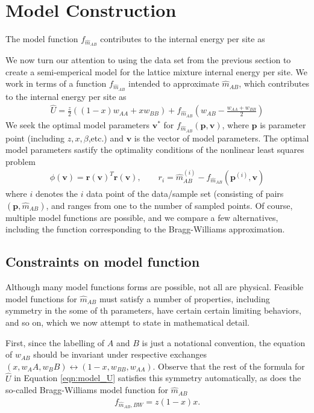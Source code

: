 \documentclass[10pt]{article}
\begin{document}
\section{Model Construction}
The model function $f_{\hat{m}_{AB}}$ contributes to the internal energy per site as

We now turn our attention to using the data set from the previous section to create a semi-emperical model for the lattice mixture internal energy per site.
We work in terms of a function $f_{\hat{m}_{AB}}$ intended to approximate $\hat{m}_{AB}$, which contributes to the internal energy per site as
\begin{align}
    \hat{U} = \frac{z}{2} \left( (1-x) w_{AA} + x w_{BB} \right) +
    f_{\hat{m}_{AB}} \left( w_{AB} - \frac{w_{AA} + w_{BB}}{2} \right)
    \label{eqn:model_U}
\end{align}
We seek the optimal model parameters $\mathbf{v}^*$ for $f_{\hat{m}_{AB}}(\mathbf{p},\mathbf{v})$, where $\mathbf{p}$ is  parameter point (including $z,x,\beta$,etc.) and $\mathbf{v}$ is the vector of model parameters.
The optimal model parameters sastify the optimality conditions of the nonlinear least squares problem
\begin{align}
\phi(\mathbf{v}) = \mathbf{r}(\mathbf{v})^T \mathbf{r}(\mathbf{v}),
\quad\quad r_i = \hat{m}_{AB}^{(i)} - f_{\hat{m}_{AB}}(\mathbf{p}^{(i)},\mathbf{v})
\end{align}
where $i$ denotes the $i$ data point of the data/sample set (consisting of pairs $(\mathbf{p},\hat{m}_{AB})$, and ranges from one to the number of sampled points.
Of course, multiple model functions are possible, and we compare a few alternatives, including the function corresponding to the Bragg-Williams approximation.

\subsection{Constraints on model function}
Although many model functions forms are possible, not all are physical.
Feasible model functions for $\hat{m}_{AB}$ must satisfy a number of properties, including symmetry in the some of th parameters, have certain certain limiting behaviors, and so on, which we now attempt to state in mathematical detail.

First, since the labelling of $A$ and $B$ is just a notational convention, the equation of $w_{AB}$ should be invariant under respective exchanges $(x,w_AA,w_BB) \longleftrightarrow (1-x,w_{BB},w_{AA})$.
Observe that the rest of the formula for $\hat{U}$ in Equation \ref{eqn:model_U} satisfies this symmetry automatically, as does the so-called Bragg-Williams model function for $\hat{m}_{AB}$
\begin{align}
    f_{\hat{m}_{AB},BW} = z (1-x) x.
    \label{eqn:BW_model_function}
\end{align}
\end{document}
